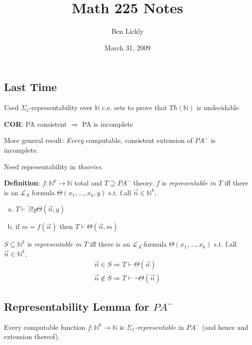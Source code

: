 \documentclass[12pt]{article}
\author{Ben Lickly}
\date{March 31, 2009}
\title{Math 225 Notes}
\newcommand{\Nat}{\ensuremath{\mathbb{N}}}
\newcommand{\proves}{\vdash}
\newcommand{\defn}{\textbf{Definition}: }
\begin{document}
\maketitle

\subsection*{Last Time}
Used $\Sigma_1$-representability over $\Nat$
c.e. sets to prove that $Th(\Nat)$ is undecidable

\textbf{COR}: PA consistent $\Rightarrow$ PA is incomplete

More general result:
\emph{Every} computable, consistent extension of $PA^-$ is incomplete.

Need representability in \emph{theories}.

\defn $f : \Nat^k \rightarrow \Nat$ total
        and $T \supseteq PA^-$ theory.
$f$ is \emph{representable in $T$} iff there is an $\mathcal{L}_A$ formula
$\Theta(x_1, \dots, x_k, y)$ s.t. f.all $\vec{n}\in\Nat^k$,
\begin{enumerate}[(a)]
  \item $T \proves \exists !y \Theta(\vec{n},y)$
  \item if $m = f(\vec{n})$ then $T \proves \Theta(\vec{n}, m)$
\end{enumerate}

$S \subseteq \Nat^k$ is \emph{representable in $T$} iff 
there is an $\mathcal{L}_A$-formula
$\Theta(x_1, \dots, x_k)$ s.t. f.all $\vec{n} \in \Nat^k$,
\begin{align*}
  \vec{n} \in S \Rightarrow T \proves \Theta(\vec{n}) \\
  \vec{n} \not\in S \Rightarrow T \proves \neg\Theta(\vec{n})
\end{align*}

\subsection*{Representability Lemma for $PA^-$}
Every computable function $f: \Nat^k \rightarrow \Nat$
is \emph{$\Sigma_1$-representable} in $PA^-$ (and hence and extension thereof).
\end{document}
